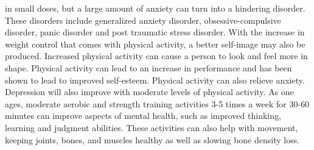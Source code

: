 \documentclass[12pt,article]{IEEEtran}
\begin{document}
	in small doses, but a large amount of anxiety can turn into a hindering disorder. These disorders include generalized anxiety disorder, obsessive-compulsive 
	disorder, panic disorder and post traumatic stress disorder. \cite{13}  
	With the increase in weight control that comes with physical activity, a better self-image may also be produced. Increased physical activity can cause a person 
	to look and feel more in shape. Physical activity can lead to an increase in performance and has been shown to lead to improved self-esteem. Physical activity 
	can also relieve anxiety. \cite{13} Depression will also improve with moderate levels of physical activity. \cite{17}
	As one ages, moderate aerobic and strength training activities 3-5 times a week for 30-60 minutes can improve aspects of mental health, such as improved thinking, 
	learning and judgment abilities. These activities can also help with movement, keeping joints, bones, and muscles healthy as well as slowing bone density loss. \cite{18}




\end{document}
